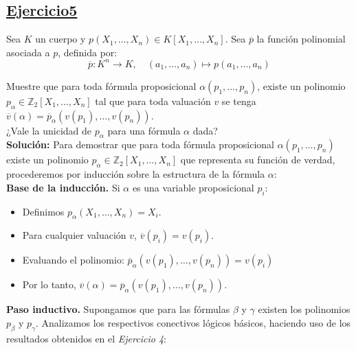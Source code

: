 \subsection*{\uline{Ejercicio5}}
    Sea $K$ un cuerpo y $p(X_1, \dots, X_n) \in K[X_1, \dots, X_n]$. Sea $\overline{p}$ la función polinomial asociada a $p$, definida por:
    \begin{equation*}
        \overline{p} : K^n \rightarrow K, \quad (a_1, \dots, a_n) \mapsto p(a_1, \dots, a_n)
    \end{equation*}

    Muestre que para toda fórmula proposicional $\alpha(p_1, \dots, p_n)$, existe un polinomio $p_\alpha \in \mathbb{Z}_2[X_1, \dots, X_n]$ tal que para toda valuación $v$ se tenga $\overline{v}(\alpha) = \overline{p}_\alpha(v(p_1), \dots, v(p_n))$. \\

    ¿Vale la unicidad de $p_\alpha$ para una fórmula $\alpha$ dada?\\

    \textbf{Solución:} Para demostrar que para toda fórmula proposicional $\alpha (p_1,\dots, p_n)$ existe un polinomio $p_\alpha \in \mathbb{Z}_2[X_1,\dots,X_n]$ que representa su función de verdad, procederemos por inducción sobre la estructura de la fórmula $\alpha$:\\

    \textbf{Base de la inducción.} Si $\alpha$ es una variable proposicional $p_i$:

    \begin{itemize}
       \item Definimos $p_\alpha(X_1,\dots, X_n)=X_i$.
       \item Para cualquier valuación $v$, $\overline{v}(p_i)=v(p_i)$.
       \item Evaluando el polinomio: $\overline{p}_\alpha (v(p_1),\dots, v(p_n))=v(p_i)$
       \item Por lo tanto, $\overline{v}(\alpha)=\overline{p}_\alpha (v(p_1),\dots, v(p_n))$.
    \end{itemize}

    \textbf{Paso inductivo.} Supongamos que para las fórmulas $\beta$ y $\gamma$ existen los polinomios $p_\beta$ y $p_\gamma$. Analizamos los respectivos conectivos lógicos básicos, haciendo uso de los resultados obtenidos en el \textit{Ejercicio 4}:

